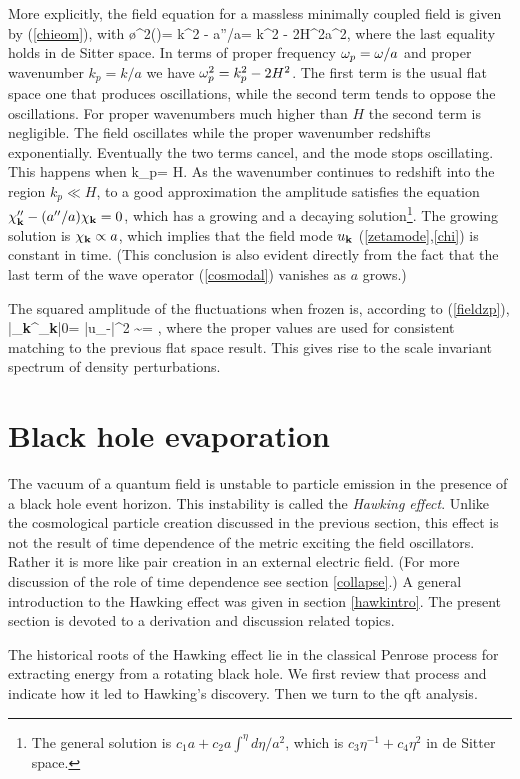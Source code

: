 \documentclass[12pt]{article}
\newcommand{\sect}[1]{\section{#1}\setcounter{equation}{0}}
\begin{document}
More explicitly, 
the field equation for a massless minimally coupled
field is given by (\ref{chieom}),
with 
%
\beq
\o^2(\eta)= k^2 - a''/a= k^2 - 2H^2a^2,
\eeq
%
where the last equality holds in de Sitter space.
In terms of proper frequency $\omega_p=\omega/a$ and proper
wavenumber  $k_p=k/a$
we have $\omega_p^2=k_p^2 - 2H^2$. The first term is the usual
flat space one that produces oscillations, while the second term 
tends to oppose the oscillations. 
For proper wavenumbers much higher than $H$ the
second term is negligible. The field oscillates while
the proper wavenumber redshifts exponentially. Eventually
the two terms cancel, and the mode stops oscillating.
This happens when
%
\beq
k_p=  H.
\eeq
%
As the wavenumber continues to redshift into the region $k_p\ll H$, 
to a good approximation 
the amplitude satisfies the equation $\chi_{\bf k}''-(a''/a)\chi_{\bf k}=0$,
which has a growing and a decaying solution\footnote{The general 
solution is $c_1 a + c_2 a\int^\eta d\eta/a^2$, which is  
$c_3 \eta^{-1} + c_4 \eta^2$ in de Sitter space.}. 
The growing solution is $\chi_{\bf k}\propto a$, 
which implies that the field mode
$u_{\bf k}$ (\ref{zetamode},\ref{chi}) is constant in time.
(This conclusion is also evident
directly from  the fact that the last term of the wave operator (\ref{cosmodal})
vanishes as $a$ grows.)

The squared amplitude of the fluctuations when frozen is, according to
(\ref{fieldzp}), 
%
\beq
{}|\fphi_{\bf k}^\dagger\fphi_{\bf k}|0\ra= 
|u_{-\bk}|^2 \sim {}= ,
\eeq
%
where the proper values are used for consistent matching to the 
previous flat space result. This gives rise to the scale invariant
spectrum of density perturbations.

\sect{Black hole evaporation}

The vacuum of  a quantum field is unstable to particle emission
in the presence of a black hole event horizon. This instability is
called the {\it Hawking effect}. Unlike the cosmological particle creation
discussed in the previous section, this effect is not the result of time
dependence of the metric exciting the field oscillators. Rather it is
more like pair creation in an external electric field\cite{Brout:rd}.
(For more discussion of the role of time dependence see
section \ref{collapse}.)
A general introduction to the Hawking effect was given in section 
\ref{hawkintro}. The present section is devoted to a derivation and discussion
related topics.

The historical roots of the Hawking effect lie in 
the classical Penrose process for extracting energy from 
a rotating black hole. We first review that process
and indicate how it led to Hawking's discovery.
Then we turn to the qft analysis.
\end{document}
